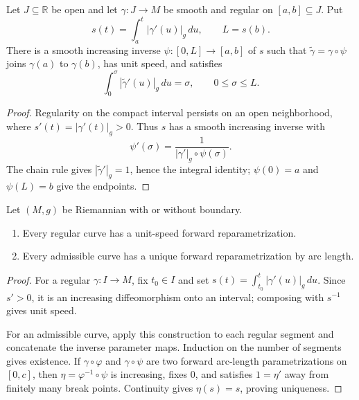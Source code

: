\begin{proposition}
\label{prop:regular-curve-unit-speed-reparam}





Let $J\subseteq\mathbb R$ be open and let $\gamma:J\to M$ be smooth and regular on $[a,b]\subseteq J$. Put
\[
s(t)=\int_a^t|\gamma'(u)|_g\,du,\qquad L=s(b).
\]
There is a smooth increasing inverse $\psi:[0,L]\to[a,b]$ of $s$ such that $\widetilde\gamma=\gamma\circ\psi$ joins $\gamma(a)$ to $\gamma(b)$, has unit speed, and satisfies
\[
\int_0^\sigma|\widetilde\gamma'(u)|_g\,du=\sigma,\qquad 0\le\sigma\le L.
\]
\end{proposition}
\begin{proof}

\sketch Regularity on the compact interval persists on an open neighborhood, where $s'(t)=|\gamma'(t)|_g>0$. Thus $s$ has a smooth increasing inverse with
\[
\psi'(\sigma)=\frac1{|\gamma'|_g\circ\psi(\sigma)}.
\]
The chain rule gives $|\widetilde\gamma'|_g=1$, hence the integral identity; $\psi(0)=a$ and $\psi(L)=b$ give the endpoints.
\end{proof}

\begin{proposition}
\label{prop:reparametrization-by-arc-length}

Let $(M,g)$ be Riemannian with or without boundary.
\begin{enumerate}
\item[(a)] Every regular curve has a unit-speed forward reparametrization.
\item[(b)] Every admissible curve has a unique forward reparametrization by arc length.
\end{enumerate}
\end{proposition}
\begin{proof}
\sketch For a regular $\gamma:I\to M$, fix $t_0\in I$ and set $s(t)=\int_{t_0}^t|\gamma'(u)|_g\,du$. Since $s'>0$, it is an increasing diffeomorphism onto an interval; composing with $s^{-1}$ gives unit speed.

For an admissible curve, apply this construction to each regular segment and concatenate the inverse parameter maps. Induction on the number of segments gives existence. If $\gamma\circ\varphi$ and $\gamma\circ\psi$ are two forward arc-length parametrizations on $[0,c]$, then $\eta=\varphi^{-1}\circ\psi$ is increasing, fixes $0$, and satisfies $1=\eta'$ away from finitely many break points. Continuity gives $\eta(s)=s$, proving uniqueness.
\end{proof}

